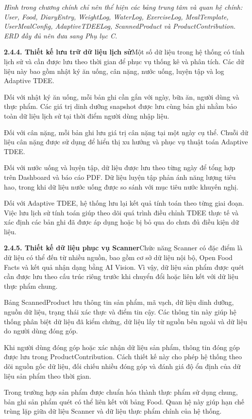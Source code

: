 \textit{Hình trong chương chính chỉ nên thể hiện các bảng trung tâm và quan hệ chính: User, Food, DiaryEntry, WeightLog, WaterLog, ExerciseLog, MealTemplate, UserMealConfig, AdaptiveTDEELog, ScannedProduct và ProductContribution. ERD đầy đủ nên đưa sang Phụ lục C.}

\textbf{2.4.4. Thiết kế lưu trữ dữ liệu lịch sử}Một số dữ liệu trong hệ thống có tính lịch sử và cần được lưu theo thời gian để phục vụ thống kê và phân tích. Các dữ liệu này bao gồm nhật ký ăn uống, cân nặng, nước uống, luyện tập và log Adaptive TDEE.

Đối với nhật ký ăn uống, mỗi bản ghi cần gắn với ngày, bữa ăn, người dùng và thực phẩm. Các giá trị dinh dưỡng snapshot được lưu cùng bản ghi nhằm bảo toàn dữ liệu lịch sử tại thời điểm người dùng nhập liệu.

Đối với cân nặng, mỗi bản ghi lưu giá trị cân nặng tại một ngày cụ thể. Chuỗi dữ liệu cân nặng được sử dụng để hiển thị xu hướng và phục vụ thuật toán Adaptive TDEE.

Đối với nước uống và luyện tập, dữ liệu được lưu theo từng ngày để tổng hợp trên Dashboard và báo cáo PDF. Dữ liệu luyện tập phản ánh năng lượng tiêu hao, trong khi dữ liệu nước uống được so sánh với mục tiêu nước khuyến nghị.

Đối với Adaptive TDEE, hệ thống lưu lại kết quả tính toán theo từng giai đoạn. Việc lưu lịch sử tính toán giúp theo dõi quá trình điều chỉnh TDEE thực tế và xác định các bản ghi đã được áp dụng hoặc bị bỏ qua do chưa đủ điều kiện dữ liệu.

\textbf{2.4.5. Thiết kế dữ liệu phục vụ Scanner}Chức năng Scanner có đặc điểm là dữ liệu có thể đến từ nhiều nguồn, bao gồm cơ sở dữ liệu nội bộ, Open Food Facts và kết quả nhận dạng bằng AI Vision. Vì vậy, dữ liệu sản phẩm được quét cần được lưu theo cấu trúc riêng trước khi chuyển đổi hoặc liên kết với dữ liệu thực phẩm chung.

Bảng ScannedProduct lưu thông tin sản phẩm, mã vạch, dữ liệu dinh dưỡng, nguồn dữ liệu, trạng thái xác thực và điểm tin cậy. Các thông tin này giúp hệ thống phân biệt dữ liệu đã kiểm chứng, dữ liệu lấy từ nguồn bên ngoài và dữ liệu do người dùng đóng góp.

Khi người dùng đóng góp hoặc xác nhận dữ liệu sản phẩm, thông tin đóng góp được lưu trong ProductContribution. Cách thiết kế này cho phép hệ thống theo dõi nguồn gốc dữ liệu, đối chiếu nhiều đóng góp và đánh giá độ ổn định của dữ liệu sản phẩm theo thời gian.

Trong trường hợp sản phẩm được chuẩn hóa thành thực phẩm sử dụng chung, bản ghi sản phẩm quét có thể liên kết với bảng Food. Quan hệ này giúp hạn chế trùng lặp giữa dữ liệu Scanner và dữ liệu thực phẩm chính của hệ thống.

